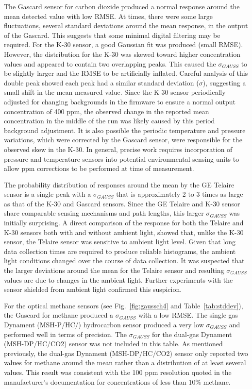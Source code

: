 \documentclass[preprint,sort&compress]{elsarticle}
\begin{document}
			The Gascard sensor for carbon dioxide produced a normal response around the mean detected value with low RMSE.  At times, there were some large fluctuations, several standard deviations around the mean response, in the output of the Gascard.  This suggests that some minimal digital filtering may be required.  For the K-30 sensor, a good Gaussian fit was produced (small RMSE).  However, the distribution for the K-30 was skewed toward higher concentration values and appeared to contain two overlapping peaks. This caused the $\sigma_{GAUSS}$ to be slightly larger and the RMSE to be artificially inflated.  Careful analysis of this double peak showed each peak had a similar standard deviation ($\sigma$), suggesting a small shift in the mean measured value.  Since the K-30 sensor periodically adjusted for changing backgrounds in the firmware to ensure a normal output concentration of 400 ppm, the observed change in the reported mean concentration in the middle of the run was likely caused by this period background adjustment.  It is also possible the periodic temperature and pressure variations, which were corrected by the Gascard sensor, were responsible for the observed skew in the K-30.  In general, precise work requires incorporation of pressure and temperature sensors into potential environmental sensing units to allow ppm corrections to be performed at time of measurement.
			
			The probability distribution of responses around the mean by the GE Telaire sensor is a single peak with a $\sigma_{GAUSS}$ that is approximately 2 to 3 times as large as that of the K-30 and Gascard sensors.  Since the GE Telaire and K-30 sensor share comparable sensing mechanisms and path lengths, this larger $\sigma_{GAUSS}$ was initially surprising.  A direct comparison of the response for both the Telaire and K-30 sensors both with and without ambient light, showed that, unlike the K-30 sensor, the Telaire sensor was sensitive to ambient light level.  Given that long data collection times are required to produce reliable histograms, the ambient light conditions changed over the course of data collection.  It was suspected that the larger deviations around the mean for the Telaire sensor and resulting $\sigma_{GAUSS}$ values are due to changes in the ambient light.  Further experiments with the sensor shielded from ambient light confirmed this suspicion.
			
			For the optical methane sensors (see Fig.~\ref{fig:gaussch4} and Table~\ref{tab:stddev}), the Gascard for methane produced a $\sigma_{GAUSS}$ with a low RMSE. The single gas Dynament (MSH-P/HC/) hydrocarbon sensor produced a very low $\sigma_{GAUSS}$ and performed well in terms of precision.  The $\sigma_{GAUSS}$ for the dual-gas Dynament (MSH-DP/HC/CO2) sensor was not included in this table.  As mentioned previously, the dual-gas Dynament (MSH-DP/HC/CO2) sensor only reported two values for methane around the mean rather than a distribution of at least several values.  This result was consistent with the 100 ppm resolution quoted in the manufacturer's documentation for concentrations of less than 10\% methane.  
			
\end{document}
